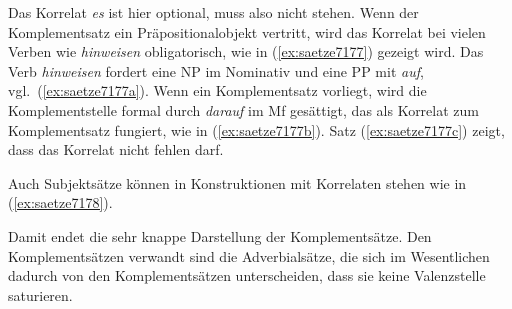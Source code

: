 \newpage

\begin{exe}
  \ex\label{ex:saetze7175}
  \begin{xlist}
  \end{xlist}
\end{exe}

Das Korrelat \textit{es} ist hier optional, muss also nicht stehen.
Wenn der Komplementsatz ein Präpositionalobjekt vertritt, wird das Korrelat bei vielen Verben wie \textit{hinweisen} obligatorisch, wie in (\ref{ex:saetze7177}) gezeigt wird.
Das Verb \textit{hinweisen} fordert eine NP im Nominativ und eine PP mit \textit{auf}, vgl.\ (\ref{ex:saetze7177a}).
Wenn ein Komplementsatz vorliegt, wird die Komplementstelle formal durch \textit{darauf} im Mf gesättigt, das als Korrelat zum Komplementsatz fungiert, wie in (\ref{ex:saetze7177b}).
Satz (\ref{ex:saetze7177c}) zeigt, dass das Korrelat nicht fehlen darf.

\begin{exe}
  \ex\label{ex:saetze7177}
  \begin{xlist}
  \end{xlist}
\end{exe}

Auch Subjektsätze können in Konstruktionen mit Korrelaten stehen wie in (\ref{ex:saetze7178}).

\begin{exe}
  \ex\label{ex:saetze7178}
  \begin{xlist}
  \end{xlist}
\end{exe}

Damit endet die sehr knappe Darstellung der Komplementsätze.
Den Komplementsätzen verwandt sind die Adverbialsätze, die sich im Wesentlichen dadurch von den Komplementsätzen unterscheiden, dass sie keine Valenzstelle saturieren.

